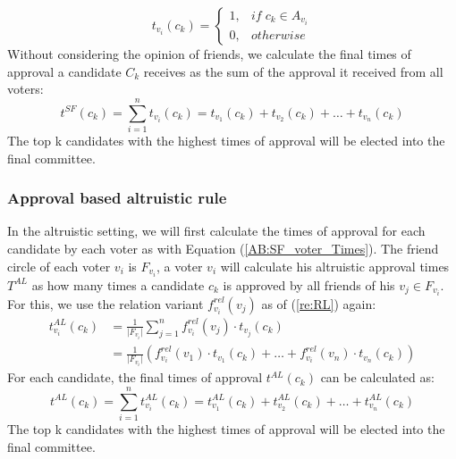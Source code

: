 \documentclass{article}
\begin{document}
\begin{equation} 
        t_{v_i}(c_k) =
        \begin{cases}
        1, &if \; c_k \in A_{v_i} \\
        0, &otherwise
        \end{cases}\label{AB:SF_voter_Times}
\end{equation}
Without considering the opinion of friends, we calculate the final times of approval a candidate $C_k$ receives as the sum of the approval it received from all voters:
\begin{equation}
t^{SF}(c_k) = \sum_{i=1}^{n} t_{v_i}(c_k)= t_{v_1}(c_k) + t_{v_2}(c_k) + \dots + t_{v_n}(c_k)\label{AB:SF_aggr_voter_Score}
\end{equation}
The top k candidates with the highest times of approval will be elected into the final committee.

\subsubsection{Approval based altruistic rule}

In the altruistic setting, we will first calculate the times of approval for each candidate by each voter as with Equation (\ref{AB:SF_voter_Times}). The friend circle of each voter $v_i$ is $F_{v_i}$, a voter $v_i$ will calculate his altruistic approval times $T^{AL}$ as how many times a candidate $c_k$ is approved by all friends of his $v_j \in F_{v_i}$. For this, we use the relation variant $f_{v_i}^{rel}(v_j)$ as of (\ref{re:RL}) again: \begin{equation}
   \begin{split}
t_{v_i}^{AL}(c_k) &= \frac{1}{\vert F_{v_i}\vert}\sum_{j=1}^{n} f_{v_i}^{rel}(v_j)\cdot t_{v_j}(c_k) \\
            &= \frac{1}{\vert F_{v_i}\vert}(f_{v_i}^{rel}(v_1)\cdot t_{v_1}(c_k) + \dots + f_{v_i}^{rel}(v_n)\cdot t_{v_n}(c_k))\label{AB:AL_singlevoter_Times}
\end{split} 
\end{equation}
For each candidate, the final times of approval $t^{AL}(c_k)$ can be calculated as:
\begin{equation}
t^{AL}(c_k) = \sum_{i=1}^{n} t_{v_i}^{AL}(c_k)= t_{v_1}^{AL}(c_k) + t_{v_2}^{AL}(c_k) + \dots + t_{v_n}^{AL}(c_k)\label{AB:AL_aggr_voter_Times}
\end{equation}
The top k candidates with the highest times of approval will be elected into the final committee.
\end{document}
